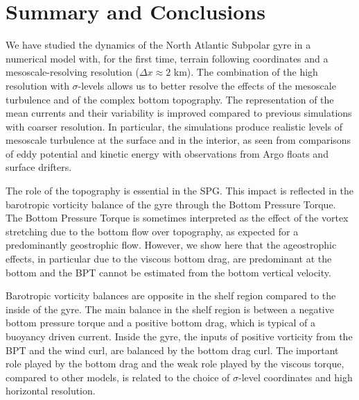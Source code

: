 \documentclass{ametsoc}
\begin{document}

\section{Summary and Conclusions}

We have studied the dynamics of the North Atlantic Subpolar gyre in a numerical model with, for the first time, terrain following coordinates and a mesoscale-resolving resolution ($\Delta x \approx 2$ km). The combination of the high resolution with $\sigma$-levels allows us to better resolve the effects of the mesoscale turbulence and of the complex bottom topography. The representation of the mean currents and their variability is improved compared to previous simulations with coarser resolution. In particular, the simulations produce realistic levels of mesoscale turbulence at the surface and in the interior, as seen from comparisons of eddy potential and kinetic energy with observations from Argo floats and surface drifters.

The role of the topography is essential in the SPG. This impact is reflected in the barotropic vorticity balance of the gyre through the Bottom Pressure Torque. The Bottom Pressure Torque is sometimes interpreted as the effect of the vortex stretching due to the bottom flow over topography, as expected for a predominantly geostrophic flow. However, we show here that the ageostrophic effects, in particular due to the viscous bottom drag, are predominant at the bottom and the BPT cannot be estimated from the bottom vertical velocity. %

Barotropic vorticity balances are opposite in the shelf region compared to the inside of the gyre. The main balance in the shelf region is between a negative bottom pressure torque and a positive bottom drag, which is typical of a buoyancy driven current. Inside the gyre, the inputs of positive vorticity from the BPT and the wind curl, are balanced by the bottom drag curl. The important role played by the bottom drag and the weak role played by the viscous torque, compared to other models, is related to the choice of $\sigma$-level coordinates and high horizontal resolution. %
\end{document}
